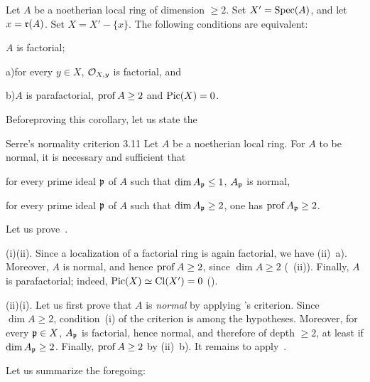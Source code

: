 \begin{corollaire} \label{XI.3.10}
Let $A$ be a noetherian local ring of dimension $\geq 2$. Set $X'=\operatorname{Spec}(A)$, and let $x = \mathfrak{r}(A)$. Set $X=X'-\{x\}$. The following conditions are equivalent:
\begin{enumeratei}
\item
$A$ is factorial;
\item
\textup{a)}\enspace for every $y\in X$, $\mathcal O_{X, y}$ is factorial, and
\par\hspace*{6.3mm}\textup{b)}\enspace $A$ is parafactorial, \ie $\operatorname{prof} A\geq 2$ and $\operatorname{Pic}(X)=0$.
\end{enumeratei}
\end{corollaire}

Before\pageoriginale proving this corollary, let us state the
\label{XI.3.11}
\begin{enonce*}{Serre's normality criterion 3.11\sfootnotemark} Let $A$ be a noetherian local ring. For $A$ to be normal, it is necessary and sufficient that
\begin{enumeratei}
\item
for every prime ideal ${\mathfrak{p}}$ of $A$ such that $\dim A_{{\mathfrak{p}}}\leq 1$, $A_{{\mathfrak{p}}}$ is normal,
\item
for every prime ideal ${\mathfrak{p}}$ of $A$ such that $\dim A_{{\mathfrak{p}}}\geq 2$, one has $\operatorname{prof} A_{{\mathfrak{p}}}\geq 2$.
\end{enumeratei}
\end{enonce*}

Let us prove~.

(i)\ALORS (ii). Since a localization of a factorial ring is again factorial, we have (ii)~a). Moreover, $A$ is normal, and hence $\operatorname{prof} A\geq 2$, since $\dim A\geq 2$ (~(ii)). Finally, $A$ is parafactorial; indeed, $\operatorname{Pic}(X)\simeq\operatorname{Cl}(X')=0$ (\cf {}).

(ii)\ALORS (i). Let us first prove that $A$ is \emph{normal} by applying 's criterion. Since $\dim A\geq 2$, condition~(i) of the criterion is among the hypotheses. Moreover, for every ${\mathfrak{p}}\in X$, $A_{{\mathfrak{p}}}$ is factorial, hence normal, and therefore of depth $\geq 2$, at least if $\dim A_{{\mathfrak{p}}}\geq 2$. Finally, $\operatorname{prof} A\geq 2$ by (ii)~b). It remains to apply~.

\smallskip
Let us summarize the foregoing:

